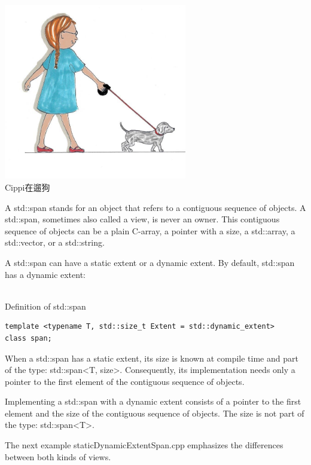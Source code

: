 \begin{center}
\includegraphics[width=0.6\textwidth]{content/3/chapter5/images/3.png}\\
Cippi在遛狗
\end{center}

A std::span stands for an object that refers to a contiguous sequence of objects. A std::span, sometimes also called a view, is never an owner. This contiguous sequence of objects can be a plain C-array, a pointer with a size, a std::array, a std::vector, or a std::string.

A std::span can have a static extent or a dynamic extent. By default, std::span has a dynamic extent:

\hspace*{\fill} \\ %
\noindent
Definition of std::span
\begin{lstlisting}[style=styleCXX]
template <typename T, std::size_t Extent = std::dynamic_extent>
class span;
\end{lstlisting}


When a std::span has a static extent, its size is known at compile time and part of the type: std::span<T, size>. Consequently, its implementation needs only a pointer to the first element of the contiguous sequence of objects.

Implementing a std::span with a dynamic extent consists of a pointer to the first element and the size of the contiguous sequence of objects. The size is not part of the type: std::span<T>.

The next example staticDynamicExtentSpan.cpp emphasizes the differences between both kinds of views.

